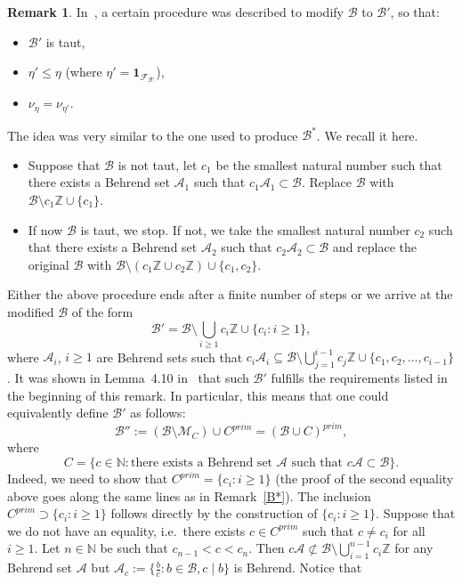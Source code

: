 \documentclass[leqno,a4paper,12pt]{article}
\theoremstyle{definition}
\newtheorem{Remark}[Th]{Remark}
\newcommand{\Z}{{\mathbb{Z}}}
\newcommand{\N}{{\mathbb{N}}}
\newcommand{\cA}{\mathcal{A}}
\newcommand{\sB}{\mathscr{B}}
\begin{document}
\begin{Remark}\label{porownanie}
In~\cite{MR3803141}, a certain procedure was described to modify $\sB$ to $\sB'$, so that:
\begin{itemize}
\item $\sB'$ is taut,
\item $\eta'\leq\eta$ (where $\eta'=\mathbf{1}_{\mathcal{F}_{\sB'}}$),
\item $\nu_{\eta}=\nu_{\eta'}$.
\end{itemize}
The idea was very similar to the one used to produce $\sB^*$. We recall it here.
\begin{itemize}
\item
Suppose that $\sB$ is not taut, let $c_1$ be the smallest natural number such that there exists a Behrend set $\mathcal{A}_1$ such that $c_1\mathcal{A}_1\subset \sB$. Replace $\sB$ with $\sB\setminus c_1\Z \cup \{c_1\}$.
\item
If now $\sB$ is taut, we stop. If not, we take the smallest natural number $c_2$ such that there exists a Behrend set $\mathcal{A}_2$ such that $c_2\mathcal{A}_2\subset \sB$ and replace the original $\sB$ with $\sB\setminus (c_1\Z\cup c_2\Z)\cup\{c_1,c_2\}$.
\end{itemize}
Either the above procedure ends after a finite number of steps or we arrive at the modified $\sB$ of the form
\[
\sB'=\sB \setminus \bigcup_{i\geq 1}c_i\Z \cup \{c_i : i\geq 1\},
\]
where $\mathcal{A}_i$, $i\geq 1$ are Behrend sets such that $c_i\cA_i\subseteq\sB \setminus \bigcup_{j=1}^{i-1}c_j\Z \cup \{c_1,c_2,\ldots,c_{i-1}\}$ . It was shown in Lemma~4.10 in~\cite{MR3803141} that such $\sB'$ fulfills the requirements listed in the beginning of this remark. In particular, this means that one could equivalently define $\sB'$ as follows:
\begin{equation}\label{ce}
\sB'':=(\sB\setminus \mathcal{M}_C) \cup C^{prim}=(\sB\cup C)^{prim},
\end{equation}
where
\[
C=\{c\in \N : \text{there exists a Behrend set $\mathcal{A}$ such that }c\mathcal{A}\subset \sB\}.
\]
Indeed, we need to show that $C^{prim}=\{c_i : i\geq 1\}$ (the proof of the second equality above goes along the same lines as in Remark~\ref{B*}). The inclusion $C^{prim}\supset\{c_i : i\geq 1\}$ follows directly by the construction of $\{c_i : i\geq 1\}$. Suppose that we do not have an equality, i.e.\ there exists $c\in C^{prim}$ such that $c\neq c_i$ for all $i\geq1$. Let $n\in\N$ be such that $c_{n-1}<c<c_n$. Then $c\cA\not\subset\sB\setminus\bigcup_{i=1}^{n-1}c_i\Z$ for any Behrend set $\cA$ but $\cA_c:=\{\frac{b}{c}: b\in\sB, c\mid b\}$ is Behrend. Notice that

\end{Remark}
\end{document}
